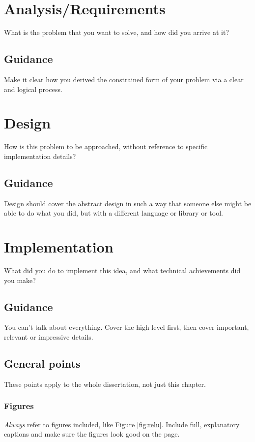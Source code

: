 \documentclass{l4proj}
\begin{document}
\chapter{Analysis/Requirements}
What is the problem that you want to solve, and how did you arrive at it?
\section{Guidance}
Make it clear how you derived the constrained form of your problem via a clear and logical process. 

\chapter{Design}
How is this problem to be approached, without reference to specific implementation details? 
\section{Guidance}
Design should cover the abstract design in such a way that someone else might be able to do what you did, but with a different language or library or tool.

\chapter{Implementation}
What did you do to implement this idea, and what technical achievements did you make?
\section{Guidance}
You can't talk about everything. Cover the high level first, then cover important, relevant or impressive details.

\section{General points}
These points apply to the whole dissertation, not just this chapter.

\subsection{Figures}
\emph{Always} refer to figures included, like Figure \ref{fig:relu}. Include full, explanatory captions and make sure the figures look good on the page.
\end{document}

